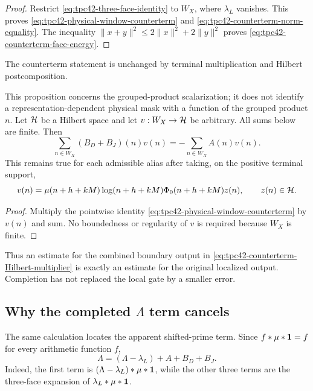 \begin{proof}
Restrict \eqref{eq:tpc42-three-face-identity} to \(W_X\), where
\(\lambda_L\) vanishes.  This proves
\eqref{eq:tpc42-physical-window-counterterm} and
\eqref{eq:tpc42-counterterm-norm-equality}.  The inequality
\(\|x+y\|^2\le 2\|x\|^2+2\|y\|^2\) proves
\eqref{eq:tpc42-counterterm-face-energy}.
\end{proof}

The counterterm statement is unchanged by terminal multiplication and
Hilbert postcomposition.

\begin{proposition}
\label{prop:tpc42-counterterm-Hilbert-multiplier}
This proposition concerns the grouped-product scalarization; it does not
identify a representation-dependent physical mask with a function of
the grouped product \(n\).
Let \(\mathcal H\) be a Hilbert space and let
\(v:W_X\to\mathcal H\) be arbitrary.  All sums below are finite.  Then
\begin{equation}
 \boxed{
 \sum_{n\in W_X}(B_D+B_J)(n)v(n)
 =-\sum_{n\in W_X}A(n)v(n).}
 \label{eq:tpc42-counterterm-Hilbert-multiplier}
\end{equation}
This remains true for each admissible alias after taking, on the positive
terminal support,
\begin{equation}
 v(n)=
 \mu(n+h+kM)\log(n+h+kM)
 \Phi_0(n+h+kM)z(n),
 \qquad z(n)\in\mathcal H.
 \label{eq:tpc42-counterterm-terminal-multiplier}
\end{equation}
\end{proposition}

\begin{proof}
Multiply the pointwise identity
\eqref{eq:tpc42-physical-window-counterterm} by \(v(n)\) and sum.
No boundedness or regularity of \(v\) is required because \(W_X\) is
finite.
\end{proof}

Thus an estimate for the combined boundary output in
\eqref{eq:tpc42-counterterm-Hilbert-multiplier} is exactly an estimate for
the original localized output.  Completion has not replaced the local
gate by a smaller error.

\subsection{Why the completed \texorpdfstring{\(\Lambda\)}{Lambda} term cancels}

The same calculation locates the apparent shifted-prime term.  Since
\(f*\mu*\mathbf 1=f\) for every arithmetic function \(f\),
\begin{equation}
 \boxed{
 \Lambda=(\Lambda-\lambda_L)+A+B_D+B_J.}
 \label{eq:tpc42-full-Lambda-decomposition}
\end{equation}
Indeed, the first term is
\((\Lambda-\lambda_L)*\mu*\mathbf 1\), while the other three terms are the
three-face expansion of \(\lambda_L*\mu*\mathbf 1\).

